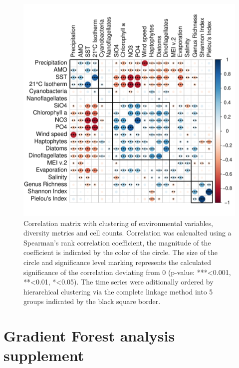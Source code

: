 \documentclass[draft]{agujournal2019}
\begin{document}
\begin{figure}[h!]
\noindent\includegraphics[width=\textwidth]{fig/CorrClustSupplementalPlot_v1.pdf}
\caption{Correlation matrix with clustering of environmental variables, diversity metrics and cell counts. Correlation was calcualted using a Spearman's rank correlation coefficient, the magnitude of the coefficient is indicated by the color of the circle. The size of the circle and significance level marking represents the calculated significance of the correlation deviating from 0 (p-value: ***\textless0.001, **\textless0.01, *\textless0.05). The time series were aditionally ordered by hierarchical clustering via the complete linkage method into 5 groups indicated by the black square border.}
\label{fig:sup:correlation}
\end{figure}


\newpage
\section{Gradient Forest analysis supplement}
\end{document}
